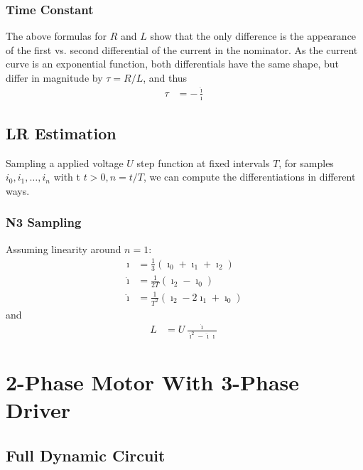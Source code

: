 \documentclass[12pt,a4paper,oneside,openany]{article}
\begin{document}
\subsubsection{Time Constant}

The above formulas for $R$ and $L$ show that the only difference is the appearance of the first vs. second differential of the current in the nominator. As the current curve is an exponential function, both differentials have the same shape, but differ in magnitude by $\tau=R/L$, and thus 
\begin{align}
\tau &= - \frac{\ddot{\imath}}{\dot{\imath}}
\end{align}

\subsection{LR Estimation}

Sampling a  applied voltage $U$ step function at fixed intervals $T$, for samples $i_0, i_1, \ldots, i_n$ with t $t>0,n=t/T$, we can compute the differentiations in different ways.

\subsubsection{N3 Sampling}

Assuming linearity around $n=1$:
\begin{align}
{\imath} &= \frac{1}{3} (\imath_0 + \imath_1 + \imath_2) \\
\dot{\imath} &= \frac{1}{2T} (\imath_2 - \imath_0) \\
\ddot{\imath} &= \frac{1}{T^2} (\imath_2 - 2\imath_1 + \imath_0)
\end{align}
and
\begin{align}
L &= U \frac{\dot{\imath}}{\dot{\imath}^2 - \ddot{\imath} \imath}
\end{align}



\section{2-Phase Motor With 3-Phase Driver}

\subsection{Full Dynamic Circuit}
\end{document}
